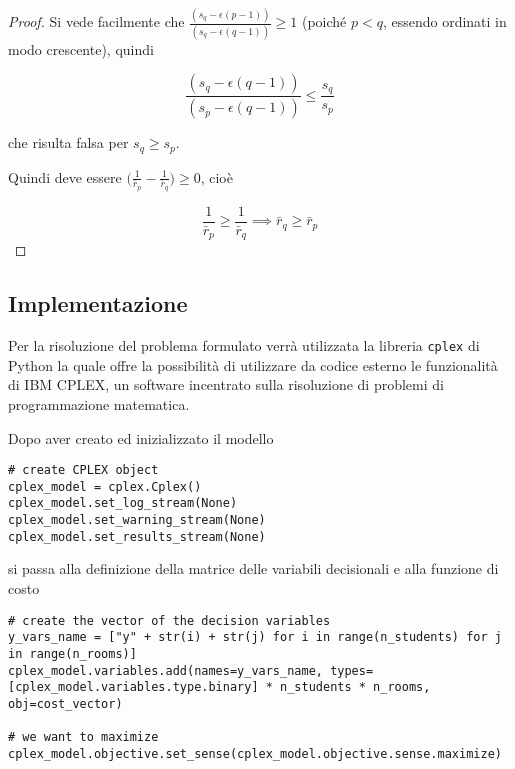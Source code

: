 \begin{proof}
    Si vede facilmente che $
    \frac{(s_q - \epsilon(p-1))}
    {(s_q - \epsilon(q-1))} \geq 1$ (poiché $p < q$, 
    essendo ordinati in modo crescente), quindi
    
    \begin{equation*}
        \frac{(s_q - \epsilon(q-1))}
        {(s_p - \epsilon(q-1))} \leq 
        \frac{s_q}{s_p}
        \label{eq:proof}
    \end{equation*}
    
    \noindent
    che risulta falsa per $s_q \geq s_p$. 
    
    Quindi deve essere $\bigg( \frac{1}{\bar{r}_p} - \frac{1}{\bar{r}_q} \bigg) \geq 0$, cioè
    
    \begin{equation}
        \frac{1}{\bar{r}_p} \geq \frac{1}{\bar{r}_q} \implies \bar{r}_q \geq \bar{r}_p
        \label{eq:}
    \end{equation}
    
\end{proof} 
    
\subsection{Implementazione}
\label{section:allocation_implementation}

Per la risoluzione del problema formulato verrà utilizzata la libreria \lstinline{cplex}  di Python la quale 
offre la possibilità di utilizzare da codice esterno le funzionalità di IBM CPLEX, un software 
incentrato sulla risoluzione di problemi di programmazione matematica.

Dopo aver creato ed inizializzato il modello

\begin{verbatim}
# create CPLEX object
cplex_model = cplex.Cplex()
cplex_model.set_log_stream(None)
cplex_model.set_warning_stream(None)
cplex_model.set_results_stream(None)
\end{verbatim} 

\noindent
si passa alla definizione della matrice delle variabili decisionali e alla funzione di costo

\begin{verbatim}
# create the vector of the decision variables
y_vars_name = ["y" + str(i) + str(j) for i in range(n_students) for j in range(n_rooms)]
cplex_model.variables.add(names=y_vars_name, types=[cplex_model.variables.type.binary] * n_students * n_rooms, obj=cost_vector)

# we want to maximize
cplex_model.objective.set_sense(cplex_model.objective.sense.maximize)
\end{verbatim} 

